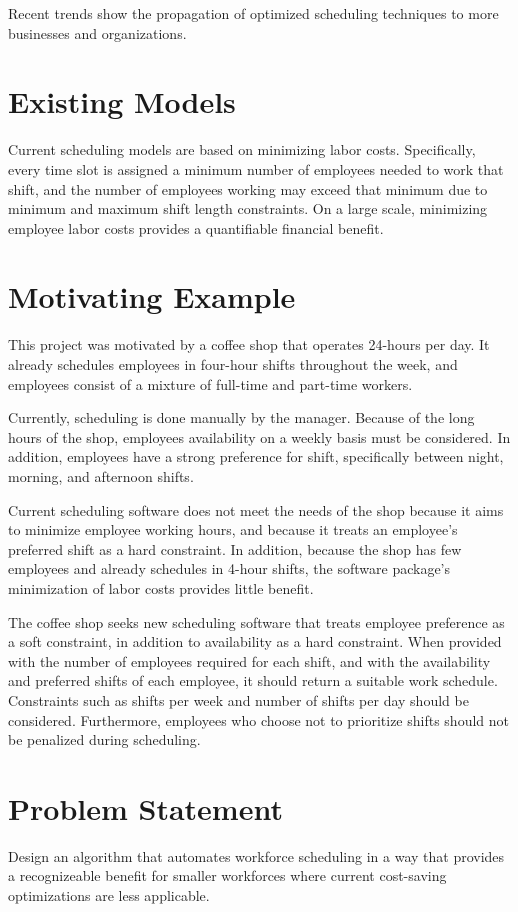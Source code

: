 Recent trends show the propagation of optimized scheduling techniques to more businesses and organizations.

\section{Existing Models}

Current scheduling models are based on minimizing labor costs. Specifically, every time slot is assigned a minimum number of employees needed to work that shift, and the number of employees working may exceed that minimum due to minimum and maximum shift length constraints.  On a large scale, minimizing employee labor costs provides a quantifiable financial benefit.

\section{Motivating Example}

This project was motivated by a coffee shop that operates 24-hours per day. It already schedules employees in four-hour shifts throughout the week, and employees consist of a mixture of full-time and part-time workers. 

Currently, scheduling is done manually by the manager. Because of the long hours of the shop, employees availability on a weekly basis must be considered. In addition, employees have a strong preference for shift, specifically between night, morning, and afternoon shifts. 

Current scheduling software does not meet the needs of the shop because it aims to minimize employee working hours, and because it treats an employee's preferred shift as a hard constraint. In addition, because the shop has few employees and already schedules in 4-hour shifts, the software package's minimization of labor costs provides little benefit. 

The coffee shop seeks new scheduling software that treats employee preference as a soft constraint, in addition to availability as a hard constraint. When provided with the number of employees required for each shift, and with the availability and preferred shifts of each employee, it should return a suitable work schedule. Constraints such as shifts per week and number of shifts per day should be considered. Furthermore, employees who choose not to prioritize shifts should not be penalized during scheduling. 



\section{Problem Statement}
Design an algorithm that automates workforce scheduling in a way that provides a recognizeable benefit for smaller workforces where current cost-saving optimizations are less applicable. 
